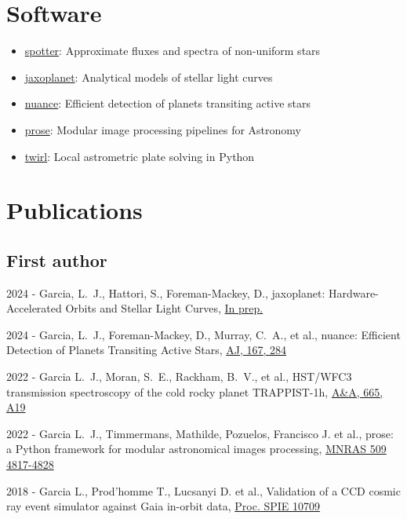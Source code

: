 \documentclass[10pt,letterpaper]{article}
\newcommand{\publi}[4]{\item #1 - #3, #2, #4}
\newcommand{\aj}{AJ}
\newcommand{\aap}{A\&A}
\begin{document}
\section*{Software}
\begin{itemize}
    \item \textsf{\href{https://github.com/lgrcia/spotter}{spotter}}: Approximate fluxes and spectra of non-uniform stars
    \item \textsf{\href{https://github.com/exoplanet-dev/jaxoplanet}{jaxoplanet}}: Analytical models of stellar light curves
    \item \textsf{\href{https://github.com/lgrcia/nuance}{nuance}}: Efficient detection of planets transiting active stars
    \item \textsf{\href{https://github.com/lgrcia/prose}{prose}}: Modular image processing pipelines for Astronomy
    \item \textsf{\href{https://github.com/lgrcia/twirl}{twirl}}: Local astrometric plate solving in Python 
\end{itemize}
\section*{Publications}
\subsection*{First author}

\begin{etaremune}
\publi{2024}{\textsf{jaxoplanet}: Hardware-Accelerated Orbits and Stellar Light Curves}
{Garcia, L.~J., Hattori, S., Foreman-Mackey, D.}
{\href{https://raw.githubusercontent.com/lgrcia/paper-jaxoplanet/main/latex/jaxoplanet_draft_20241017.pdf}{In prep.}}


\publi{2024}{\textsf{nuance}: Efficient Detection of Planets Transiting Active Stars}
{Garcia, L.~J., Foreman-Mackey, D., Murray, C.~A., et al.}
{\href{https://ui.adsabs.harvard.edu/abs/2024AJ....167..284G}{\aj, 167, 284}}

\publi{2022}{HST/WFC3 transmission spectroscopy of the cold rocky planet TRAPPIST-1h}
{Garcia L.~J., Moran, S.~E., Rackham, B.~V., et al.}
{\href{https://ui.adsabs.harvard.edu/abs/2022A\&A...665A..19G}{\aap, 665, A19}}

\publi{2022}{\textsf{prose}: a Python framework for modular astronomical images processing}
{Garcia L.~J., Timmermans, Mathilde, Pozuelos, Francisco J. et al.}
{\href{https://ui.adsabs.harvard.edu/abs/2022MNRAS.509.4817G/exportcitation}{MNRAS 509 4817-4828}}

\publi{2018}{Validation of a CCD cosmic ray event simulator against Gaia in-orbit data}
{Garcia L., Prod'homme T., Lucsanyi D. et al.}
{\href{http://doi.org/10.1117/12.2314090}{Proc. SPIE 10709}}

\end{etaremune}
\end{document}
